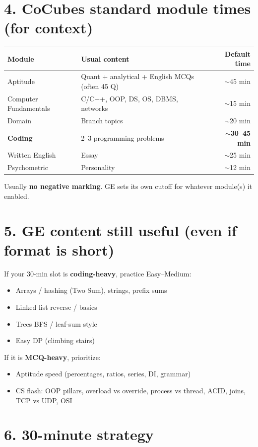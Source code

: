 \documentclass[a4paper,10pt]{article}
\begin{document}
\section{4. CoCubes standard module times (for context)}
\begin{tabularx}{\textwidth}{@{}l X r@{}}
\toprule
\textbf{Module} & \textbf{Usual content} & \textbf{Default time} \\
\midrule
Aptitude & Quant + analytical + English MCQs (often 45 Q) & $\sim$45 min \\
Computer Fundamentals & C/C++, OOP, DS, OS, DBMS, networks & $\sim$15 min \\
Domain & Branch topics & $\sim$20 min \\
\textbf{Coding} & 2--3 programming problems & \textbf{$\sim$30--45 min} \\
Written English & Essay & $\sim$25 min \\
Psychometric & Personality & $\sim$12 min \\
\bottomrule
\end{tabularx}

\vspace{1mm}
Usually \textbf{no negative marking}. GE sets its own cutoff for whatever module(s) it enabled.

\section{5. GE content still useful (even if format is short)}
If your 30-min slot is \textbf{coding-heavy}, practice Easy--Medium:
\begin{itemize}
  \item Arrays / hashing (Two Sum), strings, prefix sums
  \item Linked list reverse / basics
  \item Trees BFS / leaf-sum style
  \item Easy DP (climbing stairs)
\end{itemize}
If it is \textbf{MCQ-heavy}, prioritize:
\begin{itemize}
  \item Aptitude speed (percentages, ratios, series, DI, grammar)
  \item CS flash: OOP pillars, overload vs override, process vs thread, ACID, joins, TCP vs UDP, OSI
\end{itemize}

\section{6. 30-minute strategy}
\end{document}
